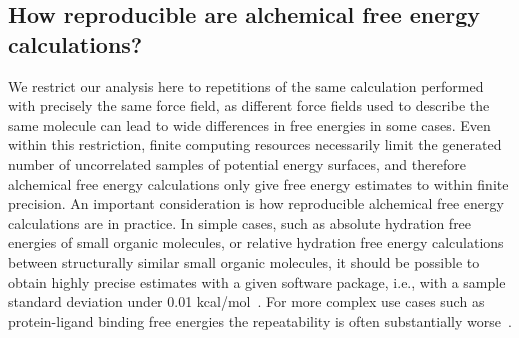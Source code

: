 \documentclass[9pt,bestpractices]{livecoms}
\begin{document}
\subsection{How reproducible are alchemical free energy calculations?}
\label{subsec:reproducible}
We restrict our analysis here to repetitions of the same calculation performed with precisely the same force field, as different force fields used to describe the same molecule can lead to wide differences in free energies in some cases.  Even within this restriction,
finite computing resources necessarily limit the generated number of uncorrelated samples of potential energy surfaces, and therefore alchemical free energy calculations only give free energy estimates to within finite precision. An important consideration is how reproducible alchemical free energy calculations are in practice. In simple cases, such as absolute hydration free energies of small organic molecules, or relative hydration free energy calculations between structurally similar small organic molecules, it should be possible to obtain highly precise estimates with a given software package, i.e., with a sample standard deviation under 0.01 kcal/mol~\cite{rizzi2019sampl6}.
For more complex use cases such as protein-ligand binding free energies the repeatability is often substantially worse~\cite{rizzi2019sampl6}. 
\end{document}
